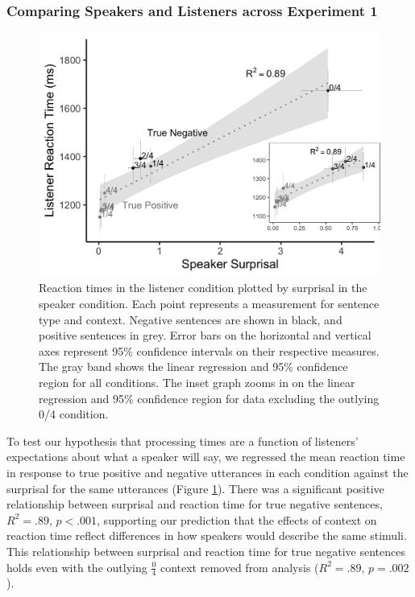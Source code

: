 \documentclass[man, floatsintext, noapacite]{apa6}
\begin{document}
\subsubsection{Comparing Speakers and Listeners across Experiment 1}

\begin{figure}[t]
\begin{center} 
\includegraphics[width=5in]{figures/experiment1/speaker_v_listener.png}
\caption{\label{fig:exp1_scatter} Reaction times in the listener condition plotted by surprisal in the speaker condition. Each point represents a measurement for sentence type and context. Negative sentences are shown in black, and positive sentences in grey. Error bars on the horizontal and vertical axes represent 95\% confidence intervals on their respective measures. The gray band shows the linear regression and  95\% confidence region for all conditions. The inset graph zooms in on the linear regression and 95\% confidence region for data excluding the outlying 0/4 condition.}
\end{center} 
\end{figure}

To test our hypothesis that processing times are a function of listeners' expectations about what a speaker will say, we regressed the mean reaction time in response to true positive and negative utterances in each condition against the surprisal for the same utterances (Figure \ref{fig:exp1_scatter}).  There was a significant positive relationship between surprisal and reaction time for true negative sentences, $R^2=.89$, $p<.001$, supporting our prediction that the effects of context on reaction time reflect differences in how speakers would describe the same stimuli. This relationship between surprisal and reaction time for true negative sentences holds even with the outlying $\frac{0}{4}$ context removed from analysis ($R^2=.89$, $p = .002$).
\end{document}
